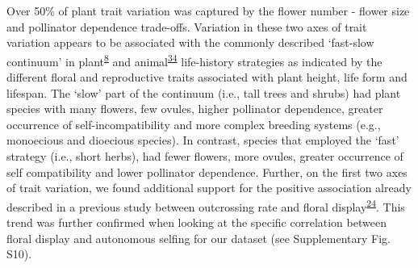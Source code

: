 \documentclass[12pt,a4paper,]{article}
\begin{document}
Over 50\% of plant trait variation was captured by the flower number -
flower size and pollinator dependence trade-offs. Variation in these two
axes of trait variation appears to be associated with the commonly
described `fast-slow continuum' in
plant\textsuperscript{\protect\hyperlink{ref-salguero2016}{8}} and
animal\textsuperscript{\protect\hyperlink{ref-healy2019}{34}}
life-history strategies as indicated by the different floral and
reproductive traits associated with plant height, life form and
lifespan. The `slow' part of the continuum (i.e., tall trees and shrubs)
had plant species with many flowers, few ovules, higher pollinator
dependence, greater occurrence of self-incompatibility and more complex
breeding systems (e.g., monoecious and dioecious species). In contrast,
species that employed the `fast' strategy (i.e., short herbs), had fewer
flowers, more ovules, greater occurrence of self compatibility and lower
pollinator dependence. Further, on the first two axes of trait
variation, we found additional support for the positive association
already described in a previous study between outcrossing rate and
floral
display\textsuperscript{\protect\hyperlink{ref-goodwillie2010}{24}}.
This trend was further confirmed when looking at the specific
correlation between floral display and autonomous selfing for our
dataset (see Supplementary Fig. S10).
\end{document}
